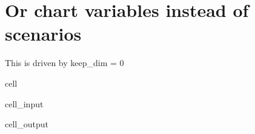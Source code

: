 \documentclass[letterpaper,10pt,english]{jupyterBook}
\begin{document}
\section{Or chart variables instead of scenarios}
\label{\detokenize{content/howto/keep/Create and modify charts with keep_plot:or-chart-variables-instead-of-scenarios}}
\sphinxAtStartPar
This is driven by keep\_dim = 0

\begin{sphinxuseclass}{cell}\begin{sphinxVerbatimInput}

\begin{sphinxuseclass}{cell_input}
\begin{sphinxVerbatim}[commandchars=\\\{\}]
 
      
\end{sphinxVerbatim}

\end{sphinxuseclass}\end{sphinxVerbatimInput}
\begin{sphinxVerbatimOutput}

\begin{sphinxuseclass}{cell_output}
\noindent{}

\end{sphinxuseclass}\end{sphinxVerbatimOutput}

\end{sphinxuseclass}
\end{document}
